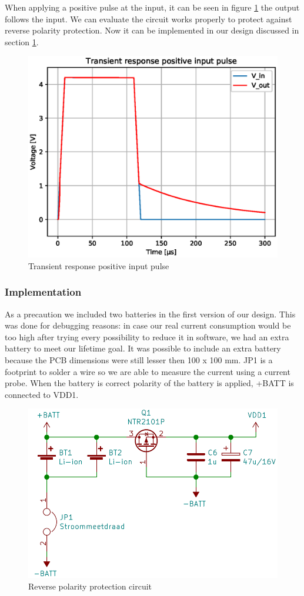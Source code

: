 \documentclass[11pt,a4paper]{article}
\begin{document}
When applying a positive pulse at the input, it can be seen in figure \ref{fig:Transient_response_positive_input_pulse} the output follows the input. We can evaluate the circuit works properly to protect against reverse polarity protection. Now it can be implemented in our design discussed in section \ref{fig:Transient_response_positive_input_pulse}.
\begin{figure}[H]
	\centering
	\includegraphics[width=0.8\linewidth]{Transient_response_positive_input_pulse.eps}
	\caption{Transient response positive input pulse}
	\label{fig:Transient_response_positive_input_pulse}
\end{figure}

\subsubsection{Implementation}\label{sec:reverse_pol_prot_implementation}
As a precaution we included two batteries in the first version of our design. This was done for debugging reasons: in case our real current consumption would be too high after trying every possibility to reduce it in software, we had an extra battery to meet our lifetime goal. It was possible to include an extra battery because the PCB dimensions were still lesser then 100 x 100 mm. JP1 is a footprint to solder a wire so we are able to measure the current using a current probe. When the battery is correct polarity of the battery is applied, +BATT is connected to VDD1.
\begin{figure}[H]
	\centering
	\includegraphics[width=0.8\linewidth]{reverse_polarity_protection.png}
	\caption{Reverse polarity protection circuit}
	\label{fig:reverse_polarity_protection}
\end{figure}
\end{document}
